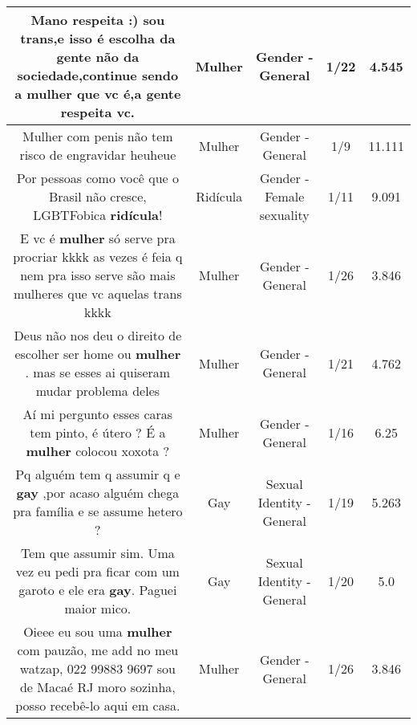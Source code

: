 \documentclass[11pt]{article}
\newlength\mylength
\begin{document}
\begin{center}
\begin{longtable}{|C{.65\mylength}|C{.30\mylength}|C{.12\mylength}|C{.12\mylength}|C{.12\mylength}|}
  \small Mano respeita :) sou trans,e isso é escolha da gente não da sociedade,continue sendo a \textbf{mulher} que vc é,a gente respeita vc.\normalsize   & Mulher & Gender - General & 1/22 & 4.545 \\  \hline
  \small Mulher com penis não tem risco de engravidar  heuheue\normalsize   & Mulher & Gender - General & 1/9 & 11.111 \\  \hline
  \small Por pessoas como você que o Brasil não cresce, LGBTFobica \textbf{ridícula}!\normalsize   & Ridícula & Gender - Female sexuality & 1/11 & 9.091 \\  \hline
  \small E vc é \textbf{mulher} só serve pra procriar kkkk as vezes é feia q nem pra isso serve são mais mulheres que vc aquelas trans kkkk\normalsize   & Mulher & Gender - General & 1/26 & 3.846 \\  \hline
  \small Deus não nos deu o direito de escolher ser home ou \textbf{mulher} . mas se esses ai quiseram mudar problema deles\normalsize   & Mulher & Gender - General & 1/21 & 4.762 \\  \hline
  \small Aí mi pergunto esses caras tem pinto, é útero ? É a \textbf{mulher} colocou xoxota ?\normalsize   & Mulher & Gender - General & 1/16 & 6.25 \\  \hline
  \small Pq alguém tem q assumir q e \textbf{gay} ,por acaso alguém chega pra família e se assume hetero ?\normalsize   & Gay & Sexual Identity - General & 1/19 & 5.263 \\  \hline
  \small Tem que assumir sim. Uma vez eu pedi pra ficar com um garoto e ele era \textbf{gay}. Paguei maior mico.\normalsize   & Gay & Sexual Identity - General & 1/20 & 5.0 \\  \hline
  \small Oieee eu sou uma \textbf{mulher} com pauzão, me add no meu watzap,  022 99883 9697 sou de Macaé RJ moro sozinha, posso recebê-lo aqui em casa.\normalsize   & Mulher & Gender - General & 1/26 & 3.846 \\  \hline

\end{longtable}
\end{center}
\end{document}
